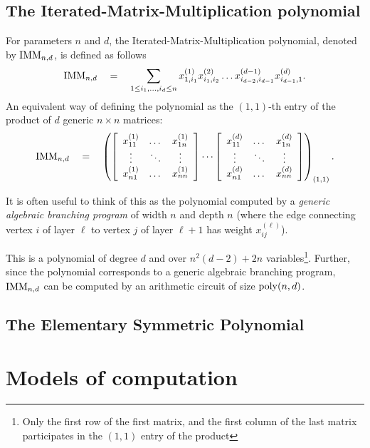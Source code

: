 \subsection*{The Iterated-Matrix-Multiplication polynomial}

For parameters $n$ and $d$, the Iterated-Matrix-Multiplication polynomial, denoted by $\operatorname{\mathrm{IMM}}_{n,d}$, is defined as follows
$$
\operatorname{\mathrm{IMM}}_{n,d} \quad = \quad \sum_{1\leq i_1,\dots, i_d\leq n} x_{1,i_1}^{(1)}x_{i_1,i_2}^{(2)}\dots x_{i_{d-2},i_{d-1}}^{(d-1)}x_{i_{d-1},1}^{(d)}.
$$
An equivalent way of defining the polynomial as the $(1,1)$-th entry of the product of $d$ generic $n\times n$ matrices:
$$
\operatorname{\mathrm{IMM}}_{n,d} \quad = \quad \left(\left[\begin{array}{ccc} x_{11}^{(1)} & \dots & x_{1n}^{(1)}\\ \vdots & \ddots & \vdots \\ x_{n1}^{(1)} & \dots & x_{nn}^{(1)}\end{array}\right] \cdots \left[\begin{array}{ccc} x_{11}^{(d)} & \dots & x_{1n}^{(d)}\\ \vdots & \ddots & \vdots \\ x_{n1}^{(d)} & \dots & x_{nn}^{(d)}\end{array}\right]\right)_{(1,1)}.
$$

It is often useful to think of this as the polynomial computed by a \emph{generic algebraic branching program} of width $n$ and depth $n$ (where the edge connecting vertex $i$ of layer $\ell$ to vertex $j$ of layer $\ell+1$ has weight $x_{ij}^{(\ell)}$). 

This is a polynomial of degree $d$ and over $n^2(d-2) + 2n$ variables\footnote{Only the first row of the first matrix, and the first column of the last matrix participates in the $(1,1)$ entry of the product}.
Further, since the polynomial corresponds to a generic algebraic branching program, $\operatorname{\mathrm{IMM}}_{n,d}$ can be computed by an arithmetic circuit of size $\operatorname{poly}(n,d)$. 

\subsection*{The Elementary Symmetric Polynomial}


\section{Models of computation}

